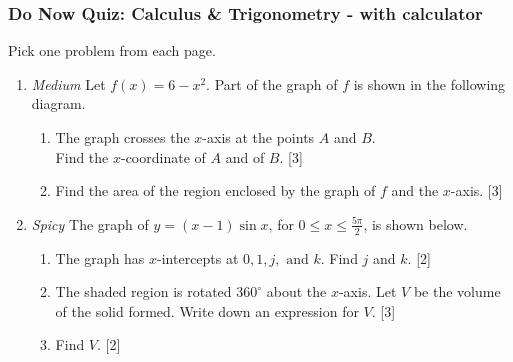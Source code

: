 \documentclass[12pt, twoside]{article}
\begin{document}
\subsubsection*{Do Now Quiz: Calculus \& Trigonometry - with calculator}
Pick one problem from each page.
 \begin{enumerate}
  

\item \emph{Medium} Let $f(x)=6-x^2$. Part of the graph of $f$ is shown in the following diagram.
    \begin{center}
    \end{center}
  \begin{enumerate}
    \item The graph crosses the $x$-axis at the points $A$ and $B$.\\
    Find the $x$-coordinate of $A$ and of $B$. \hfill [3]
    \item Find the area of the region enclosed by the graph of $f$ and the $x$-axis.  \hfill [3]
  \end{enumerate}

\item \emph{Spicy} The graph of $y=(x-1)\sin x$, for $0 \leq x \leq \frac{5 \pi}{2}$, is shown below.
      \begin{center}
      \end{center}
      \begin{enumerate}
        \item The graph has $x$-intercepts at $0,1, j, \text{ and }k$.
          Find $j$ and $k$. \hfill [2]
        \item The shaded region is rotated $360^\circ$ about the $x$-axis. Let $V$ be the volume of the solid formed. %
        Write down an expression for $V$. \hfill [3]
        \item Find $V$.  \hfill [2]
        \end{enumerate}


\end{enumerate}
\end{document}
